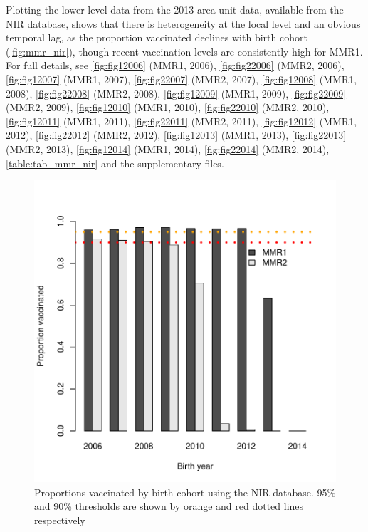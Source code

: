 \documentclass{article}
\begin{document}
Plotting the lower level data from the 2013 area unit data, available from the NIR database, shows that there is heterogeneity at the local level and an obvious temporal lag, as the proportion vaccinated declines with birth cohort (\autoref{fig:mmr_nir}), though recent vaccination levels are consistently high for MMR1. For full details, see \autoref{fig:fig12006} (MMR1, 2006), \autoref{fig:fig22006} (MMR2, 2006), \autoref{fig:fig12007} (MMR1, 2007), \autoref{fig:fig22007} (MMR2, 2007), \autoref{fig:fig12008} (MMR1, 2008), \autoref{fig:fig22008} (MMR2, 2008), \autoref{fig:fig12009} (MMR1, 2009), \autoref{fig:fig22009} (MMR2, 2009), \autoref{fig:fig12010} (MMR1, 2010), \autoref{fig:fig22010} (MMR2, 2010), \autoref{fig:fig12011} (MMR1, 2011), \autoref{fig:fig22011} (MMR2, 2011), \autoref{fig:fig12012} (MMR1, 2012), \autoref{fig:fig22012} (MMR2, 2012), \autoref{fig:fig12013} (MMR1, 2013), \autoref{fig:fig22013} (MMR2, 2013), \autoref{fig:fig12014} (MMR1, 2014), \autoref{fig:fig22014} (MMR2, 2014), \autoref{table:tab_mmr_nir} and the supplementary files.


\begin{figure}
\begin{center}
\includegraphics{draftfinalreport_v3-007}
\end{center}
\caption{Proportions vaccinated by birth cohort using the NIR database. 95\% and 90\% thresholds are shown by orange and red dotted lines respectively}
\label{fig:mmr_nir}
\end{figure}
\end{document}

